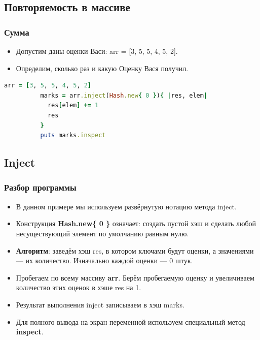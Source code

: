 \documentclass[compress,red]{beamer}
\begin{document}
\subsection{Повторяемость в массиве}
\begin{frame}[fragile]
  \frametitle{Сумма}
		\begin{itemize}
  		\item Допустим даны оценки Васи: arr = [3, 5, 5, 4, 5, 2].
  		\item Определим, сколько раз и какую Оценку Вася получил.
  	\end{itemize}
  	\scriptsize{
  		\begin{lstlisting}[language=ruby,basicstyle=\footnotesize,label=ruby3,caption=Повторяемость]
  		  arr = [3, 5, 5, 4, 5, 2]
  		  marks = arr.inject(Hash.new{ 0 }){ |res, elem| 
  		    res[elem] += 1
  		    res
  		  }
  		  puts marks.inspect
      \end{lstlisting}}
\end{frame}

\subsection{Inject}
\begin{frame}[fragile]
  \frametitle{Разбор программы}

  \begin{itemize}
    \item В данном примере мы используем развёрнутую нотацию метода inject.
    \item Конструкция \textbf{Hash.new\{ 0 \}} означает: создать пустой хэш и сделать любой несуществующий элемент по умолчанию равным нулю.
    \item \textbf{Алгоритм}: заведём хэш res, в котором ключами будут оценки, а значениями --- их количество. Изначально каждой оценки --- 0 штук.
    \item Пробегаем по всему массиву \textbf{arr}. Берём пробегаемую оценку и увеличиваем количество этих оценок в хэше res на 1. 
    \item Результат выполнения inject записываем в хэш marks.
    \item Для полного вывода на экран переменной используем специальный метод \textbf{inspect}.
  \end{itemize}
  
\end{frame}
\end{document}
